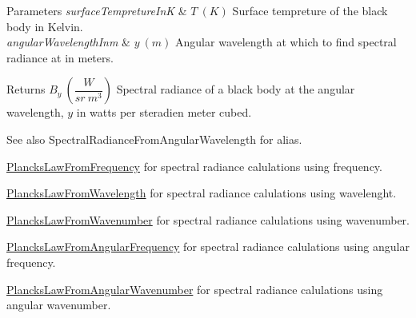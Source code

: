 \begin{DoxyParams}{Parameters}
{\em surface\+Tempreture\+InK} & $T\ (K)$ Surface tempreture of the black body in Kelvin. \\
\hline
{\em angular\+Wavelength\+Inm} & $y\ (m)$ Angular wavelength at which to find spectral radiance at in meters. \\
\hline
\end{DoxyParams}
\begin{DoxyReturn}{Returns}
$B_{y}\ ( \dfrac{W}{sr\ m^3})$ Spectral radiance of a black body at the angular wavelength, $y$ in watts per steradien meter cubed. 
\end{DoxyReturn}
\begin{DoxySeeAlso}{See also}
Spectral\+Radiance\+From\+Angular\+Wavelength for alias. 

\mbox{\hyperlink{group___e_g_x_phys-_electrodynamics-_black_body-_plancks_law_ga68aae82f8a086831358c4a61c8c80ba4}{Plancks\+Law\+From\+Frequency}} for spectral radiance calulations using frequency. 

\mbox{\hyperlink{group___e_g_x_phys-_electrodynamics-_black_body-_plancks_law_ga54639bc031ded51ef78aa82b0457a4dd}{Plancks\+Law\+From\+Wavelength}} for spectral radiance calulations using wavelenght. 

\mbox{\hyperlink{group___e_g_x_phys-_electrodynamics-_black_body-_plancks_law_ga6648ae2a0fbff6735c1e1a04c7cac746}{Plancks\+Law\+From\+Wavenumber}} for spectral radiance calulations using wavenumber. 

\mbox{\hyperlink{group___e_g_x_phys-_electrodynamics-_black_body-_plancks_law_gaac540560c71e30c02b91d22e417b5863}{Plancks\+Law\+From\+Angular\+Frequency}} for spectral radiance calulations using angular frequency. 

\mbox{\hyperlink{group___e_g_x_phys-_electrodynamics-_black_body-_plancks_law_gaa3d3e0fdb77d25bdd40523f9975de902}{Plancks\+Law\+From\+Angular\+Wavenumber}} for spectral radiance calulations using angular wavenumber. 
\end{DoxySeeAlso}
\mbox{\label{group___e_g_x_phys-_electrodynamics-_black_body-_plancks_law_gaa3d3e0fdb77d25bdd40523f9975de902}} 
